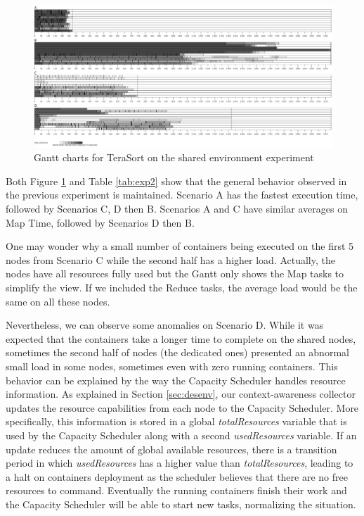 \clearpage
\begin{figure}
	\includegraphics[width=1\textheight]{img/TS-esc-amb-full.pdf}
	\caption{Gantt charts for TeraSort on the shared environment experiment}
	\label{fig:exp2}
\end{figure}
\clearpage


Both Figure \ref{fig:exp2} and Table \ref{tab:exp2} show that the general behavior observed in the previous experiment is maintained. Scenario A has the fastest execution time, followed by Scenarios C, D then B. Scenarios A and C have similar averages on Map Time, followed by Scenarios D then B. 

One may wonder why a small number of containers being executed on the first 5 nodes from Scenario C while the second half has a higher load. Actually, the nodes have all resources fully used but the Gantt only shows the Map tasks to simplify the view. If we included the Reduce tasks, the average load would be the same on all these nodes. 

Nevertheless, we can observe some anomalies on Scenario D. While it was expected that the containers take a longer time to complete on the shared nodes, sometimes the second half of nodes (the dedicated ones) presented an abnormal small load in some nodes, sometimes even with zero running containers. 
This behavior can be explained by the way the Capacity Scheduler handles resource information. As explained in Section \ref{sec:desenv}, our context-awareness collector updates the resource capabilities from each node to the Capacity Scheduler. More specifically, this information is stored in a global \textit{totalResources} variable that is used by the Capacity Scheduler along with a second \textit{usedResources} variable. If an update reduces the amount of global available resources, there is a transition period in which \textit{usedResources} has a higher value than \textit{totalResources}, leading to a halt on containers deployment as the scheduler believes that there are no free resources to command. Eventually the running containers finish their work and the Capacity Scheduler will be able to start new tasks, normalizing the situation.

